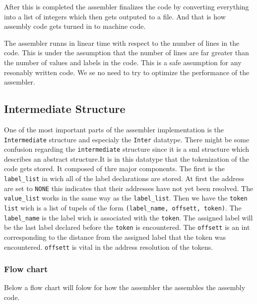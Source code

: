 \documentclass{article}
\newcommand{\V}{\verb}
\begin{document}
After this is completed the assembler finalizes the code by converting
everything into a list of integers which then gets outputed to a file. And that
is how assembly code gets turned in to machine code.

The assembler runns in linear time with respect to the number of lines in the
code. This is under the assumption that the number of lines are far greater than
the number of values and labels in the code. This is a safe assumption for any
resonably written code. We se no need to try to optimize the performance of the
assembler.

\subsection{Intermediate Structure}
One of the most important parts of the assembler implementation is the
\V+Intermediate+ structure and especialy the \V+Inter+ datatype. There might
be some confusion regarding the \V+intermediate+ structure since it is a
sml structure which describes an abstract structure.It is in this datatype that
the tokenization of the code gets stored.
It composed of thre major components. The first is the \V+label_list+ in wich all of the label
declarations are stored. At first the address are set to \V+NONE+ this indicates
that their addresses have not yet been resolved. The \V+value_list+ works in the
same way as the \V+label_list+. Then we have the \V+token list+ wich is a list
of tupels of the form \V+(label_name, offsett, token)+. The \V+label_name+ is
the label wich is associated with the \V+token+. The assigned label will be the
last label declared before the \V+token+ is encountered. The \V+offsett+ is an
int corresponding to the distance from the assigned label that the token was
encountered. \V+offsett+ is vital in the address resolution of the tokens.


\subsubsection{Flow chart}
Below a flow chart will folow for how the assembler the assembles the
assembly code.
 
\end{document}
